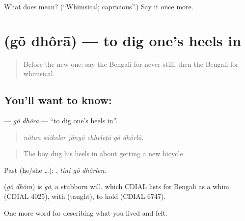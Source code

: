 \begin{tcolorbox}[breakable,colback=teal!4,colframe=teal!35!black,title={Before you move on}]
What does  mean? (\textquotedblleft{}Whimsical; capricious\textquotedblright{}.) Say it once more.
\end{tcolorbox}
\section[\texorpdfstring{\bn{গোঁ} \bn{ধরা} (gõ dhôrā)}{গোঁ ধরা (gõ dhôrā)}]{  (gõ dhôrā) — to dig one's heels in}

\label{lesson:BN-C461-go-dhora}



\begin{quote}
Before the new one: say the Bengali for never still, then the Bengali for whimsical.
\end{quote}

\subsection*{You'll want to know:  }
\textbf{ } — \emph{gõ dhôrā} — \textquotedblleft{}to dig one's heels in\textquotedblright{}.

\begin{quote}
     
\end{quote}

\begin{quote}
\emph{nôtun sāikeler jônyô chheleṭā gõ dhôrlô.}
\end{quote}

\begin{quote}
The boy dug his heels in about getting a new bicycle.
\end{quote}

Past (he/she …):   , \emph{tini gõ dhôrlen}.

\begin{cousinweb}
\textbf{ } (\emph{gõ dhôrā}) is \emph{gõ}, a stubborn will, which CDIAL lists for Bengali as a whim (CDIAL 4025), with  (taught), to hold (CDIAL 6747).
\end{cousinweb}

\begin{grammarlens}[title={What you've built}]
One more word for describing what you lived and felt.
\end{grammarlens}

